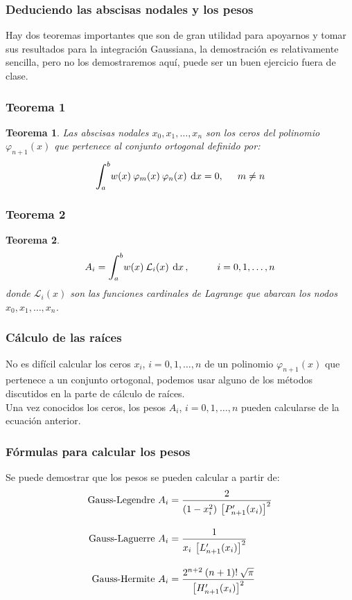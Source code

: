 \documentclass[12pt]{beamer}
\newtheorem{miteorema}{Teorema}
\begin{document}
\begin{frame}
\frametitle{Deduciendo las abscisas nodales y los pesos}
Hay dos teoremas importantes que son de gran utilidad para apoyarnos y tomar sus resultados para la integración Gaussiana, la demostración es relativamente sencilla, pero no los demostraremos aquí, puede ser un buen ejercicio fuera de clase.
\end{frame}
\begin{frame}
\frametitle{Teorema 1}
\begin{miteorema}
Las abscisas nodales $x_{0}, x_{1}, \ldots, x_{n}$ son los ceros del polinomio $\varphi_{n+1} (x)$  que pertenece al conjunto ortogonal definido por:
\begin{align*}
\scaleint{6ex}_{\bs a}^{b} w (x) \: \varphi_{m} (x) \: \varphi_{n} (x) \: \dd{x} = 0, \hspace{0.5cm} m \neq n
\end{align*}
\end{miteorema}
\end{frame}
\begin{frame}
\frametitle{Teorema 2}
\begin{miteorema}
\begin{align*}
A_{i} = \scaleint{6ex}_{\bs a}^{b} w (x) \: \mathcal{L}_{i} (x) \: \dd{x}, \hspace{1cm} i = 0, 1, \ldots, n
\end{align*}
donde $\mathcal{L}_{i} (x)$ son las funciones cardinales de Lagrange que abarcan los nodos $x_{0}, x_{1}, \ldots, x_{n}$.
\end{miteorema}
\end{frame}
\begin{frame}
\frametitle{Cálculo de las raíces}
No es difícil calcular los ceros $x_{i}$, $i = 0, 1, \ldots, n$ de un polinomio $\varphi_{n + 1} (x)$ que pertenece a un conjunto ortogonal, podemos usar alguno de los métodos discutidos en la parte de cálculo de raíces.
\\
\bigskip
\pause
Una vez conocidos los ceros, los pesos $A_{i}$, $i = 0, 1, \ldots, n$ pueden calcularse de la ecuación anterior.
\end{frame}
\begin{frame}
\frametitle{Fórmulas para calcular los pesos}
Se puede demostrar que los pesos se pueden calcular a partir de:
\pause
\begin{align*}
\text{Gauss-Legendre   }  A_{i} &= \dfrac{2}{(1 - x^{2}_{i}) \: \left[{P}^{\prime}_{n + 1} (x_{i}) \right]^{2}} \\[1em]
\text{Gauss-Laguerre   } A_{i} &= \dfrac{1}{x_{i} \: \left[{L}^{\prime}_{n + 1} (x_{i}) \right]^{2}} \\[1em]
\text{Gauss-Hermite   } A_{i} &= \dfrac{2^{n + 2} \: (n + 1)! \: \sqrt{\pi}}{\left[ {H}^{\prime}_{n + 1} (x_{i}) \right]^{2}}
\end{align*}
\end{frame}
\end{document}
